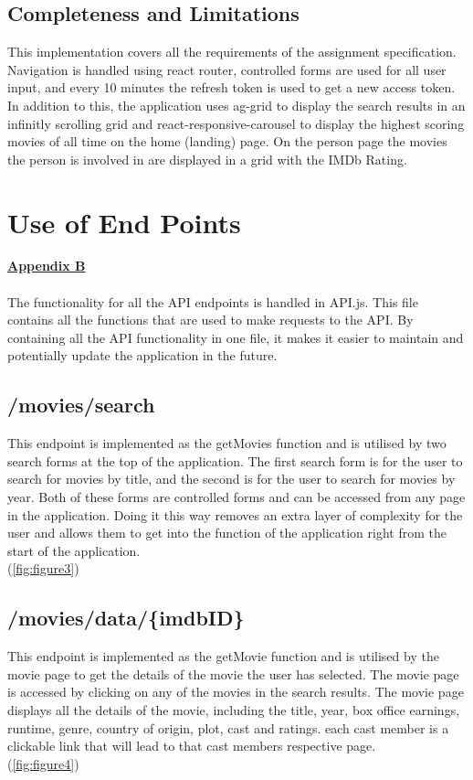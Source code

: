 \documentclass[12pt,a4paper]{article}
\begin{document}
		\subsection{Completeness and Limitations}
			This implementation covers all the requirements of the assignment specification. 
			Navigation is handled using react router, controlled forms are used for all user input, and 
			every 10 minutes the refresh token is used to get a new access token. In addition to this, 
			the application uses ag-grid to display the search results in an infinitly scrolling grid 
			and react-responsive-carousel to display the highest scoring movies of all time on the 
			home (landing) page. On the person page the movies the person is involved in are displayed 
			in a grid with the IMDb Rating.\\

	\section{Use of End Points}
		\hyperref[subsec:appendixB]{\textbf{Appendix B}}\\
		\\
		The functionality for all the API endpoints is handled in API.js. This file contains all the 
		functions that are used to make requests to the API. By containing all the API functionality 
		in one file, it makes it easier to maintain and potentially update the application in the 
		future.\\

		\subsection{/movies/search}
			This endpoint is implemented as the getMovies function and is utilised by two 
			search forms at the top of the application. The first search form is for the user to search 
			for movies by title, and the second is for the user to search for movies by year. Both of 
			these forms are controlled forms and can be accessed from any page in the application. Doing 
			it this way removes an extra layer of complexity for the user and allows them to get into the 
			function of the application right from the start of	the application.\\
			(\cref{fig:figure3})

		\subsection{/movies/data/\{imdbID\}}
			This endpoint is implemented as the getMovie function and is utilised by the movie page to 
			get the details of the movie the user has selected. The movie page is accessed by clicking 
			on any of the movies in the search results. The movie page displays all the details of the 
			movie, including the title, year, box office earnings, runtime, genre, country of origin, 
			plot, cast and ratings. each cast member is a clickable link that will lead to that cast 
			members respective page.\\
			(\cref{fig:figure4})
\end{document}
